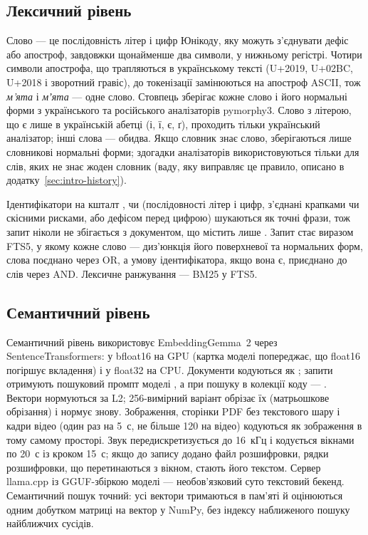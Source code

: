 \subsection{Лексичний рівень}
Слово --- це послідовність літер і цифр Юнікоду, яку можуть з'єднувати дефіс або апостроф, завдовжки щонайменше два символи, у нижньому регістрі. Чотири символи апострофа, що трапляються в українському тексті (U+2019, U+02BC, U+2018 і зворотний гравіс), до токенізації замінюються на апостроф ASCII, тож \emph{м’ята} і \emph{мʼята} --- одне слово. Стовпець  зберігає кожне слово і його нормальні форми з українського та російського аналізаторів pymorphy3. Слово з літерою, що є лише в українській абетці (і, ї, є, ґ), проходить тільки український аналізатор; інші слова --- обидва. Якщо словник знає слово, зберігаються лише словникові нормальні форми; здогадки аналізаторів використовуються тільки для слів, яких не знає жоден словник (ваду, яку виправляє це правило, описано в додатку~\ref{sec:intro-history}).

Ідентифікатори на кшталт ,  чи  (послідовності літер і цифр, з'єднані крапками чи скісними рисками, або дефісом перед цифрою) шукаються як точні фрази, тож запит  ніколи не збігається з документом, що містить лише . Запит стає виразом FTS5, у якому кожне слово --- диз'юнкція його поверхневої та нормальних форм, слова поєднано через OR, а умову ідентифікатора, якщо вона є, приєднано до слів через AND. Лексичне ранжування --- BM25 у FTS5.

\subsection{Семантичний рівень}
Семантичний рівень використовує EmbeddingGemma~2 через SentenceTransformers: у bfloat16 на GPU (картка моделі попереджає, що float16 погіршує вкладення) і у float32 на CPU. Документи кодуються як ; запити отримують пошуковий промпт моделі , а при пошуку в колекції коду --- . Вектори нормуються за L2; 256-вимірний варіант обрізає їх (матрьошкове обрізання) і нормує знову. Зображення, сторінки PDF без текстового шару і кадри відео (один раз на 5~с, не більше 120 на відео) кодуються як зображення в тому самому просторі. Звук передискретизується до 16~кГц і кодується вікнами по 20~с із кроком 15~с; якщо до запису додано файл розшифровки, рядки розшифровки, що перетинаються з вікном, стають його текстом. Сервер llama.cpp із GGUF-збіркою моделі --- необов'язковий суто текстовий бекенд. Семантичний пошук точний: усі вектори тримаються в пам'яті й оцінюються одним добутком матриці на вектор у NumPy, без індексу наближеного пошуку найближчих сусідів.

